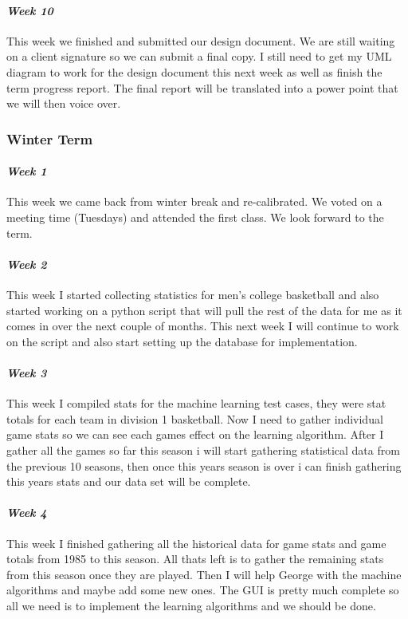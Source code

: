 \documentclass[onecolumn, draftclsnofoot,10pt, compsoc]{IEEEtran}
\begin{document}
\paragraph{\emph{Week 10}}
This week we finished and submitted our design document. We are still waiting on a client signature so we can submit a final copy. I still need to get my UML diagram to work for the design document this next week as well as finish the term progress report. The final report will be translated into a power point that we will then voice over.

\subsubsection{Winter Term}
\paragraph{\emph{Week 1}}
This week we came back from winter break and re-calibrated. We voted on a meeting time (Tuesdays) and attended the first class. We look forward to the term.
\paragraph{\emph{Week 2}}
This week I started collecting statistics for men's college basketball and also started working on a python script that will pull the rest of the data for me as it comes in over the next couple of months. This next week I will continue to work on the script and also start setting up the database for implementation.
\paragraph{\emph{Week 3}}
This week I compiled stats for the machine learning test cases, they were stat totals for each team in division 1 basketball. Now I need to gather individual game stats so we can see each games effect on the learning algorithm. After I gather all the games so far this season i will start gathering statistical data from the previous 10 seasons, then once this years season is over i can finish gathering this years stats and our data set will be complete.
\paragraph{\emph{Week 4}}
This week I finished gathering all the historical data for game stats and game totals from 1985 to this season. All thats left is to gather the remaining stats from this season once they are played. Then I will help George with the machine algorithms and maybe add some new ones. The GUI is pretty much complete so all we need is to implement the learning algorithms and we should be done.
\end{document}

